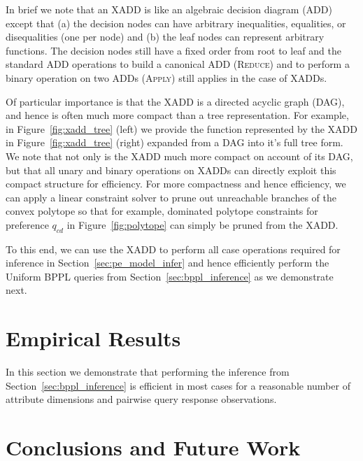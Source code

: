 \documentclass[letterpaper]{article}
\begin{document}
In brief we note that an XADD is like an algebraic decision 
diagram (ADD)~\cite{bahar93add} except that (a) the decision
nodes can have arbitrary inequalities, equalities, or disequalities (one
per node) and (b) the leaf nodes can represent arbitrary functions.
The decision nodes still have a fixed order from root to leaf
and the standard ADD
operations to build a canonical ADD (\textsc{Reduce}) and 
to perform a binary operation on two ADDs (\textsc{Apply}) 
still applies in the case of XADDs. 

Of particular importance is that the XADD is a directed acyclic graph
(DAG), and hence is often much more compact than a tree
representation.  For example, in Figure~\ref{fig:xadd_tree} (left) we provide
the function represented by the XADD in Figure~\ref{fig:xadd_tree} (right) 
expanded from a DAG into it's full tree form.  We note that not only is
the XADD much more compact on account of its DAG, but that all
unary and binary operations on XADDs can directly exploit this
compact structure for efficiency.  For more compactness and hence efficiency, 
we can apply a linear
constraint solver to prune out unreachable branches of the convex
polytope so that for example, dominated polytope constraints 
for preference $q_{cd}$ in Figure~\ref{fig:polytope} can simply
be pruned from the XADD.

To this end, we can use the XADD to perform all case operations
required for inference in Section~\ref{sec:pe_model_infer} and hence
efficiently perform the Uniform BPPL queries from
Section~\ref{sec:bppl_inference} as we demonstrate next.

\section{Empirical Results}


In this section we demonstrate that performing the inference from
Section~\ref{sec:bppl_inference} is efficient in most cases for
a reasonable number of attribute dimensions and pairwise query
response observations.





\section{Conclusions and Future Work}
\end{document}
